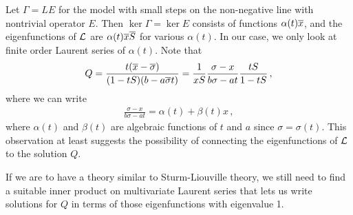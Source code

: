 
\begin{exa} Let $\Gamma = LE$ for the \oneD model with small steps on the non-negative line with nontrivial operator $E$. Then $\ker \Gamma = \ker E$ consists of functions $\alpha(t) \overline{x}$, and the eigenfunctions of $\mathcal{L}$ are $\alpha(t)\overline{x} \overline{S}$ for various $\alpha(t)$. In our case, we only look at finite order Laurent series of $\alpha(t)$. Note that
\begin{align}
	Q = \frac{t(\overline{x} - \overline{\sigma})}{(1-t S)(b-a\overline{\sigma} t)} = \frac{1}{xS}\frac{\sigma - x}{b\sigma - at}\frac{t S}{1-t S}\,,
\end{align}
where we can write
\begin{align}
	\frac{\sigma - x}{b\sigma - at} = \alpha(t) + \beta(t)x\,,
\end{align}
where $\alpha(t)$ and $\beta(t)$ are algebraic functions of $t$ and $a$ since $\sigma = \sigma(t)$. This observation at least suggests the possibility of connecting the eigenfunctions of $\mathcal{L}$ to the solution $Q$.
\end{exa}

If we are to have a theory similar to Sturm-Liouville theory, we still need to find a suitable inner product on multivariate Laurent series that lets us write solutions for $Q$ in terms of those eigenfunctions with eigenvalue 1.


